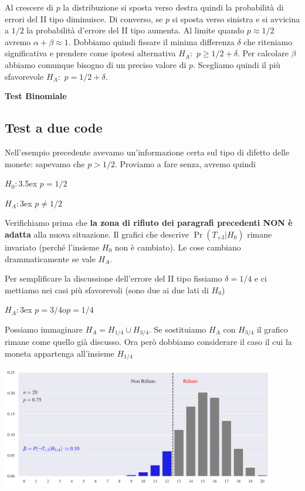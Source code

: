 \documentclass[11pt,openany]{book}
\begin{document}
Al crescere di $p$ la distribuzione si sposta verso destra quindi la probabilità di errori del II tipo diminuisce. 
Di converso, se $p$ si sposta verso sinistra e si avvicina a $1/2$  la probabilità d'errore del II tipo aumenta. Al limite quando $p\approx 1/2$ avremo $\alpha+\beta\approx 1$. 
Dobbiamo quindi fissare il minima differenza $\delta$ che riteniamo significativa e prendere come ipotesi alternativa  $H_A:$ $p\ge1/2+\delta$.
Per calcolare $\beta$ abbiamo comunque bisogno di un preciso valore di $p$.
Scegliamo quindi il più sfavorevole $H_A:$ $p=1/2+\delta$.




\clearpage\hfill\textbf{Test Binomiale}\subsection{Test a due code}

Nell'esempio precedente avevamo un'informazione certa sul tipo di difetto delle monete: sapevamo che $p>1/2$. Proviamo a fare senza, avremo quindi

$H_0:$\kern3.5ex $p=1/2$

$H_A:$\kern3ex $p\neq1/2$

Verifichiamo prima che  \textbf{la zona di rifiuto dei paragrafi precedenti NON è adatta\/} alla nuova situazione. 
Il grafici che descrive $\Pr(T_{+3}|H_0)$ rimane invariato (perché l'insieme $H_0$ non è cambiato).
Le cose cambiano drammaticamente se vale $H_A$.

Per semplificare la discussione dell'errore del II tipo fissiamo $\delta=1/4$ e ci mettiamo nei casi più sfavorevoli (sono due ai due lati di $H_0$)

$H_A:$\kern3ex $p=3/4$\quad o\quad $p=1/4$ 

Possiamo immaginare $H_A=H_{{1/4}}\cup H_{{3/4}}$. 
Se sostituiamo $H_A$ con $H_{{3/4}}$ il grafico rimane come quello già discusso. 
Ora però dobbiamo considerare il caso il cui la moneta appartenga all'insieme $H_{{1/4}}$

\hfil\includegraphics[width=0.9\textwidth]{figure/B-test_02.pdf}
\end{document}
